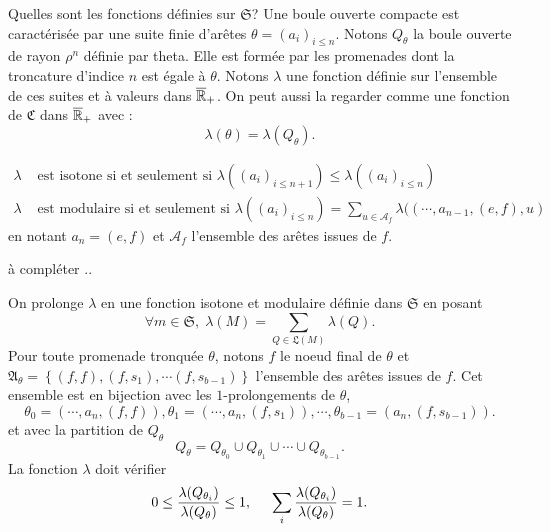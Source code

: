 Quelles sont les fonctions définies sur $\mathfrak{S}$?\newline
Une boule ouverte compacte est caractérisée par une suite finie d'arêtes $\theta = (a_i)_{i\leq n}$. Notons $Q_\theta$ la boule ouverte de rayon $\rho^n$ définie par theta. Elle est formée par les promenades dont la troncature d'indice $n$ est égale à $\theta$.\newline
Notons $\lambda$ une fonction définie sur l'ensemble de ces suites et à valeurs dans $\overline{\mathbb{R}}_+$. On peut aussi la regarder comme une fonction de $\mathfrak{C}$ dans $\overline{\mathbb{R}}_+$ avec :
\begin{displaymath}
 \lambda(\theta) = \lambda(Q_\theta).
\end{displaymath}

\begin{prop}
\begin{align*}
  \lambda &\text{ est isotone si et seulement si } \lambda \left((a_i)_{i\leq n+1}\right) \leq \lambda \left((a_i)_{i\leq n}\right) \\
  \lambda &\text{ est modulaire si et seulement si } \lambda((a_i)_{i\leq n}) = \sum_{u \in \mathcal{A}_f} \lambda((\cdots, a_{n-1}, (e,f),u)
\end{align*}
en notant $a_n = (e,f)$ et $\mathcal{A}_f$ l'ensemble des arêtes issues de $f$.
\end{prop}
\begin{demo}
 à compléter ..
\end{demo}
\noindent On prolonge $\lambda$ en une fonction isotone et modulaire définie dans $\mathfrak{S}$ en posant
\begin{displaymath}
 \forall m \in \mathfrak{S}, \; \lambda(M) = \sum_{Q \in \mathfrak{L}(M)} \lambda(Q).
\end{displaymath}
Pour toute promenade tronquée $\theta$, notons $f$ le noeud final de $\theta$ et $\mathfrak{A}_\theta = \left\lbrace (f,f), (f,s_1), \cdots (f,s_{b-1})\right\rbrace$ l'ensemble des arêtes issues de $f$. Cet ensemble est en bijection avec les $1$-prolongements de $\theta$,
\begin{displaymath}
 \theta_0 = (\cdots, a_n, (f,f)), \theta_1 = (\cdots, a_n, (f,s_1)), \cdots , \theta_{b-1}= (a_n, (f,s_{b-1})).
\end{displaymath}
et avec la partition de $Q_\theta$
\begin{displaymath}
 Q_\theta = Q_{\theta_0} \cup Q_{\theta_1} \cup \cdots \cup Q_{\theta_{b-1}}.
\end{displaymath}
La fonction $\lambda$ doit vérifier
\begin{displaymath}
 0 \leq \frac{\lambda(Q_{\theta_i})}{\lambda(Q_\theta)} \leq 1, \hspace{0.5cm} \sum_i \frac{\lambda(Q_{\theta_i})}{\lambda(Q_\theta)} = 1 .
\end{displaymath}

